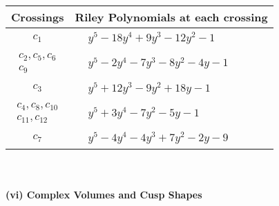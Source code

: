 \documentclass[1p]{elsarticle_modified}
\theoremstyle{definition}
\begin{document}
\begin{tabular}{m{50pt}|m{274pt}}
Crossings & \hspace{64pt}Riley Polynomials at each crossing \\
\hline $$\begin{aligned}c_{1}\end{aligned}$$&$\begin{aligned}
&y^5-18 y^4+9 y^3-12 y^2-1
\end{aligned}$\\
\hline $$\begin{aligned}c_{2},c_{5},c_{6}\\c_{9}\end{aligned}$$&$\begin{aligned}
&y^5-2 y^4-7 y^3-8 y^2-4 y-1
\end{aligned}$\\
\hline $$\begin{aligned}c_{3}\end{aligned}$$&$\begin{aligned}
&y^5+12 y^3-9 y^2+18 y-1
\end{aligned}$\\
\hline $$\begin{aligned}c_{4},c_{8},c_{10}\\c_{11},c_{12}\end{aligned}$$&$\begin{aligned}
&y^5+3 y^4-7 y^2-5 y-1
\end{aligned}$\\
\hline $$\begin{aligned}c_{7}\end{aligned}$$&$\begin{aligned}
&y^5-4 y^4-4 y^3+7 y^2-2 y-9
\end{aligned}$\\
\hline
\end{tabular}\\~\\
\newpage\flushleft \textbf{(vi) Complex Volumes and Cusp Shapes}
\end{document}
